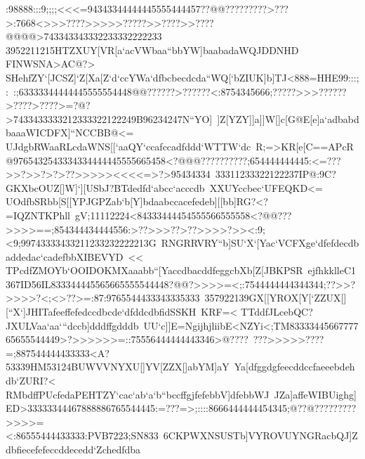 {{{ :98888:::9;;;;<<<=94343344444445555444457??@@?????????>???>:7668<>>>????>>>>>?????>>????>>????@@@@>743343343332233332222233%
 3952211215HTZXUY[VR[a`acVWbaa``bbYW]baabadaWQJDDNHD%
 FINWSNA>AC@?>}
 \hbox{SHehfZY`[JCSZ]`Z[Xa[Z`d`ccYWa`dfbcbecdcda``WQ[`bZIUK]b]TJ<888=HHE99:::;:%
 :;63333344444445555554448@@??????>??????<:8754345666;?????>>>??????>????>????>=?@?>7433433333212333322122249B96234247N``YO]%
 ]Z[YZY]]a]]W[]c[G@E[e]a`adbabdbaaaWICDFX]``NCCBB@<=}
 \hbox{UJdgbRWaaRLcdaWNS[[`aaQY`ccafccadfddd`WTTW`dc%
 R;=>KR[e[C==APcR@9765432543334334444445555665458<?@@@??????????;654444444445:<=???>>?>>?>?>??>>>>><<<<=>?>95434334%
 33311233322122237IP@:9C?GKXbcOUZ[]W]`][USbJ?BTdedfd`abcc`acccdb%
 XXUYccbec`UFEQKD<=}
 \hbox{UOdfbSRbb[S[[YPJGPZab`b[Y]bdaabccacefedeb][[bb]RG?<?=IQZNTKPhll%
 gV;11112224<84333444454555566555558<?@@???>>>>==;854344434444556:>??>>>??>??>>>>?>><:9;<9;99743333433211233232222213G%
 RNGRRVRY``b]SU`X`[Yac`VCFXge`dfefdecdbaddedac`cadefbbXIBEVYD%
 <<}
 \hbox{TPcdfZMOYb`OOIDOKMXaaabb``[YaccdbacddfeggcbXb[Z[JBKPSR%
 ejfhkklleC1367ID56IL833344445565665555544448?@@?>>>>=<;:7544444444344344;??>>?>>>>?<;<>??>=:87:9765544433343335333%
 357922139GX[[YROX[Y[`ZZUX[][``X`]JHITafeeffefedccdbcde`dfddcdbfidSSKH%
 KRF=<}
 \hbox{TTddfJLcebQC?JXULVaa`aa```dccb]dddffgdddb%
 UU`c]]E=NgijhjliibE<NZYi<;TM8333344566777765655544449>?>>>>>>=::75556444444443346>@????%
 ???>>>>>????=;887544444433333<A?53339HM53124BUWVVNYXU[]YV[ZZX[]abYM]aY%
 Ya[dfggdgfeecddccfaeeebdehdb`ZURI?<}
 \hbox{RMbdffPUcfedaPEHTZY`cac`ab`a`b``bccffgjfefebbV]dfebbWJ%
 JZa]affeWIBUighg]ED>33333344467888886765544445:=???=>;::::8666444444454345;@??@?????????>>>>=<:86555444433333:PVB7223;SN833%
 6CKPWXNSUSTb]VYROVUYNGRacbQJ]Zdbfiecefefeccddecedd`Zchedfdba%
}}}
